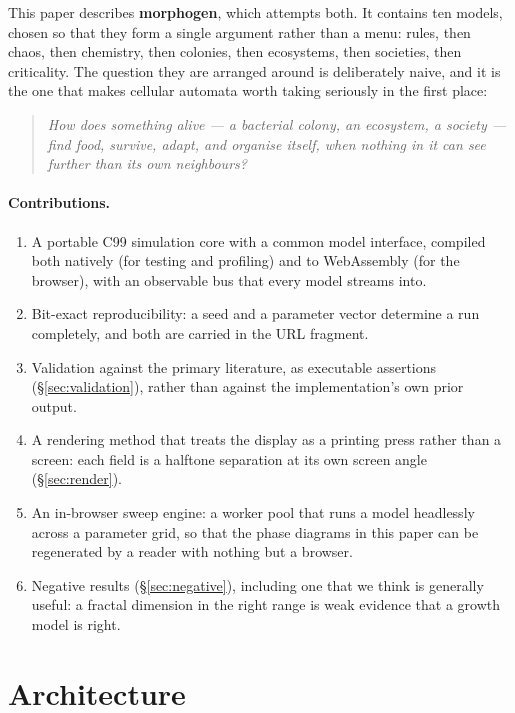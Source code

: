\documentclass[11pt,a4paper]{article}
\begin{document}
This paper describes \textbf{morphogen}, which attempts both. It contains ten
models, chosen so that they form a single argument rather than a menu: rules,
then chaos, then chemistry, then colonies, then ecosystems, then societies, then
criticality. The question they are arranged around is deliberately naive, and it
is the one that makes cellular automata worth taking seriously in the first
place:

\begin{quote}
\emph{How does something alive --- a bacterial colony, an ecosystem, a society
--- find food, survive, adapt, and organise itself, when nothing in it can see
further than its own neighbours?}
\end{quote}

\paragraph{Contributions.}
\begin{enumerate}\setlength{\itemsep}{2pt}
  \item A portable C99 simulation core with a common model interface, compiled
    both natively (for testing and profiling) and to WebAssembly (for the
    browser), with an observable bus that every model streams into.
  \item Bit-exact reproducibility: a seed and a parameter vector determine a run
    completely, and both are carried in the URL fragment.
  \item Validation against the primary literature, as executable assertions
    (\S\ref{sec:validation}), rather than against the implementation's own prior
    output.
  \item A rendering method that treats the display as a printing press rather
    than a screen: each field is a halftone separation at its own screen angle
    (\S\ref{sec:render}).
  \item An in-browser sweep engine: a worker pool that runs a model headlessly
    across a parameter grid, so that the phase diagrams in this paper can be
    regenerated by a reader with nothing but a browser.
  \item Negative results (\S\ref{sec:negative}), including one that we think is
    generally useful: a fractal dimension in the right range is weak evidence
    that a growth model is right.
\end{enumerate}

\section{Architecture}
\end{document}
